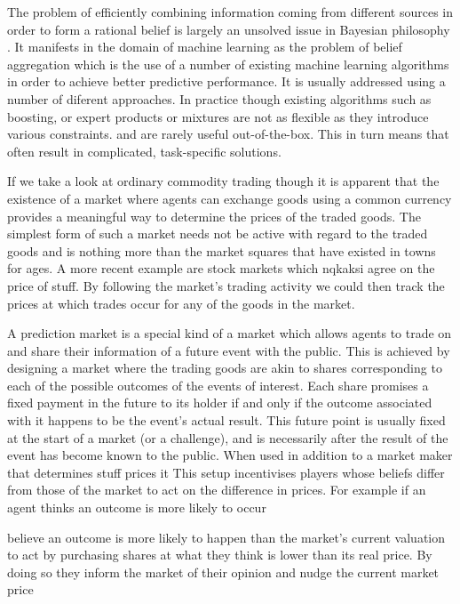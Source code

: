 \documentclass[bsc,frontabs,twoside,singlespacing,parskip,deptreport]{infthesis}     %
\begin{document}
The problem of efficiently combining information coming from different sources in order to form a rational belief is largely an unsolved issue in Bayesian philosophy \cite{greene_collective_2010}. It manifests in the domain of machine learning as the problem of belief aggregation which is the use of a number of existing machine learning algorithms in order to achieve better predictive performance. It is usually addressed using a number of diferent approaches. In practice though existing algorithms such as boosting, or expert products or mixtures are not as flexible as they introduce various constraints. and are rarely useful out-of-the-box. This in turn means that often result in complicated, task-specific solutions.

	If we take a look at ordinary commodity trading though it is apparent that the existence of a market where agents can exchange goods using a common currency provides a meaningful way to determine the prices of the traded goods. The simplest form of such a market needs not be active with regard to the traded goods and is nothing more than the market squares that have existed in towns for ages. A more recent example are stock markets which nqkaksi agree on the price of stuff. By following the market's trading activity we could then track the prices at which trades occur for any of the goods in the market. 

	A prediction market is a special kind of a market which allows agents to trade on and share their information of a future event with the public. This is achieved by designing a market where the trading goods are akin to shares corresponding to each of the possible outcomes of the events of interest. Each share promises a fixed payment in the future to its holder if and only if the outcome associated with it happens to be the event's actual result. This future point is usually fixed at the start of a market (or a challenge), and is necessarily after the result of the event has become known to the public. When used in addition to a market maker that determines stuff prices it This setup incentivises players whose beliefs differ from those of the market to act on the difference in prices. For example if an agent thinks an outcome is more likely to occur

 believe an outcome is more likely to happen than the market's current valuation to act by purchasing shares at what they think is lower than its real price. By doing so they inform the market of their opinion and nudge the current market price 
\end{document}
